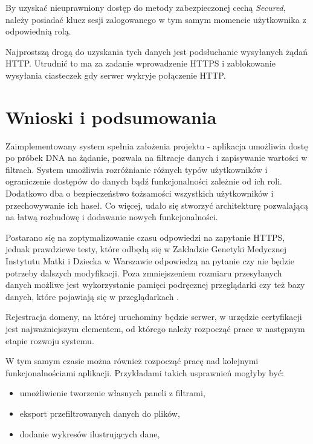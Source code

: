 \documentclass[a4paper,12pt,twoside]{article}
\begin{document}
By uzyskać nieuprawniony dostęp do metody zabezpieczonej cechą \textit{Secured},
należy posiadać klucz sesji zalogowanego w tym samym momencie użytkownika 
z odpowiednią rolą. 

Najprostszą drogą do uzyskania tych danych jest podsłuchanie wysyłanych
żądań HTTP. Utrudnić to ma za zadanie wprowadzenie HTTPS i zablokowanie wysyłania
ciasteczek gdy serwer wykryje połączenie HTTP. 
  
\newpage
\section{Wnioski i podsumowania}  

Zaimplementowany system spełnia założenia projektu - aplikacja
umożliwia dostę po próbek DNA na żądanie, pozwala na filtracje danych
i zapisywanie wartości w filtrach. 
System umożliwia rozróżnianie różnych typów użytkowników 
i ograniczenie dostępów do danych bądź funkcjonalności zależnie od ich
roli.
Dodatkowo dba o bezpieczeństwo
tożsamości wszystkich użytkowników i przechowywanie ich haseł.
Co więcej, udało się stworzyć
architekturę pozwalającą na łatwą rozbudowę 
i dodawanie nowych funkcjonalności. 

Postarano się na zoptymalizowanie czasu odpowiedzi na zapytanie HTTPS,
jednak prawdziewe testy, które odbędą się w Zakładzie Genetyki Medycznej Instytutu Matki i Dziecka w Warszawie odpowiedzą na pytanie czy 
nie będzie potrzeby dalszych modyfikacji. Poza zmniejszeniem
rozmiaru przesyłanych danych możliwe jest wykorzystanie pamięci podręcznej
przeglądarki czy też bazy danych, które pojawiają się w przeglądarkach  \cite{w3cDatabase}.

Rejestracja domeny, na której uruchominy będzie serwer,
w urzędzie certyfikacji jest najważniejszym elementem,
od którego należy rozpocząć prace w następnym etapie rozwoju systemu.

W tym samym czasie można również rozpocząć pracę nad kolejnymi funkcjonalnościami
aplikacji. Przykładami takich usprawnień mogłyby być:
\begin{itemize}
\item umożliwienie tworzenie własnych paneli z filtrami,
\item eksport przefiltrowanych danych do plików,
\item dodanie wykresów ilustrujących dane,
\end{itemize}
\end{document}

